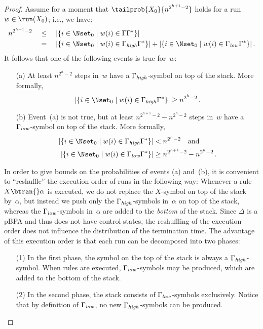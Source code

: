 \begin{proof}
 Assume for a moment that $\tailprob{X_0}{n^{2^{h+1}-2}}$ holds for a run~$w \in \run(X_0)$;
  i.e., we have:
 \begin{align*}
  n^{2^{h+1}-2} \quad & \le \quad |\{ i \in \Nset_0 \mid w(i) \in \Gamma\Gamma^*\}| \\
   & = \quad |\{ i \in \Nset_0 \mid w(i) \in \GammaH\Gamma^*\}| + |\{ i \in \Nset_0 \mid w(i) \in \GammaL\Gamma^*\}|\,.
 \end{align*}
 It follows that one of the following events is true for~$w$:
 \begin{itemize}
  \item[(a)]
   At least $n^{2^h-2}$ steps in~$w$ have a $\Gamma_{\it high}$-symbol on top of the stack.
   More formally,
    \[
     |\{ i \in \Nset_0 \mid w(i) \in \GammaH\Gamma^*\}| \ge n^{2^h-2}\,.
    \]
  \item[(b)]
   Event~(a) is not true, but at least $n^{2^{h+1}-2} - n^{2^{h}-2}$ steps in~$w$ have a $\Gamma_{\it low}$-symbol on top of the stack.
   More formally,
    \begin{align*}
     |\{ i \in \Nset_0 \mid w(i) \in \GammaH\Gamma^*\}| & < n^{2^h-2} \quad \text{and} \\
     |\{ i \in \Nset_0 \mid w(i) \in \GammaL\Gamma^*\}| & \ge n^{2^{h+1}-2} - n^{2^{h}-2}\,.
    \end{align*}
 \end{itemize}
 In order to give bounds on the probabilities of events (a) and~(b),
  it is convenient to ``reshuffle'' the execution order of runs in the following way:
 Whenever a rule $X \btran{} \alpha$ is executed, we do not replace the $X$-symbol on top of the stack by~$\alpha$,
  but instead we push only the $\Gamma_{\it high}$-symbols in~$\alpha$ on top of the stack, whereas the $\Gamma_{\it low}$-symbols in~$\alpha$
  are added to the {\em bottom} of the stack.
 Since $\Delta$ is a pBPA and thus does not have control states,
  the reshuffling of the execution order does not influence the distribution of the termination time.
 The advantage of this execution order is that each run can be decomposed into two phases:
 \begin{itemize}
  \item[(1)]
   In the first phase, the symbol on the top of the stack is always a $\Gamma_{\it high}$-symbol.
   When rules are executed, $\Gamma_{\it low}$-symbols may be produced, which are added to the bottom of the stack.
  \item[(2)]
   In the second phase, the stack consists of $\Gamma_{\it low}$-symbols exclusively.
   Notice that by definition of $\Gamma_{\it low}$, no new $\Gamma_{\it high}$-symbols can be produced.

\end{itemize}
\end{proof}
